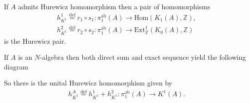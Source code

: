\documentclass{beamer}
\theoremstyle{plain}
\newcommand{\be}{\begin{equation}}
\newcommand{\ee}{\end{equation}}
\newcommand{\Z}{\mathbb{Z}}                  %
\newcommand{\Hom}{\mathrm{Hom}}
\newcommand{\Ext}{\mathrm{Ext}}       %
\newcommand{\bean}{\begin{eqnarray*}}
\newcommand{\eean}{\end{eqnarray*}}
\newcommand{\bydef}{\stackrel{\mathrm{def}}{=}}
\begin{document}
\begin{frame}
\begin{definition}\label{hurewicz_pair_defn}
	If $A$ \alert{admits  Hurewicz homomorphism}  then a pair of  homomorphisms
	\be
	\begin{split}
		h^1_{K^1}\bydef r_1 \circ s_1: \pi^{\mathrm{ab}}_1\left(A \right)\to  \Hom\left(K_1\left(A\right), \Z\right), \\
		h^2_{K^1}\bydef r_2 \circ s_2:\pi^{\mathrm{ab}}_1\left(A \right)\to  \Ext^1_\Z\left(K_0\left(A\right), \Z\right) 
	\end{split}
	\ee
	is the \alert{Hurewicz pair}.
\end{definition}

\end{frame}
\begin{definition}
If $A$ is an $N$-algebra then both direct sum and  exact sequence yield the following diagram
\newline
{}
So there is the  \alert{unital Hurewicz homomorphism} given by
\bean
h^A_{K^1}	\bydef h^1_{K^1} + h^2_{K^1}:\pi^{\mathrm{ab}}_1\left(A\right)\to  K^1\left(A \right). 
\eean	
\end{definition}
\end{document}
